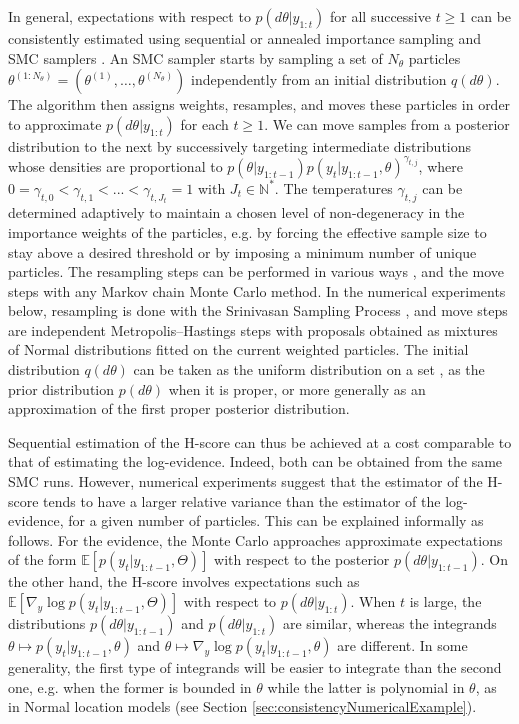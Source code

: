 \documentclass[12pt]{article}
\theoremstyle{plain}
\theoremstyle{definition}
\begin{document}
	In general, expectations with respect to $p(d\theta|y_{1:t})$ for all successive $t\geq 1$ can be
	consistently estimated using sequential or annealed importance sampling \citep{neal2001} and SMC samplers \citep{chopin:2002,delmoral:doucet:jasra2006}. An SMC sampler starts by sampling a set of $N_\theta$ particles
	$\theta^{(1:N_\theta)} = (\theta^{(1)},\ldots,\theta^{(N_\theta)})$ independently from an initial distribution
	$q(d\theta)$. The algorithm then assigns weights, resamples, and moves these particles in
	order to approximate $p(d\theta|y_{1:t})$ 
	for each $t\geq 1$. 
	We can move samples from a posterior distribution to the next 
	by successively targeting intermediate distributions whose densities are
	proportional to $p(\theta|y_{1:t-1}) p(y_t|y_{1:t-1},\theta)^{\gamma_{t,j}}$,
	where $0=\gamma_{t,0} < \gamma_{t,1} < ... < \gamma_{t,J_t} = 1$ with
	$J_t\in\mathbb{N}^*$. The temperatures $\gamma_{t,j}$ can be determined
	adaptively to maintain a chosen level of non-degeneracy in the
	importance weights of the particles, e.g.\! by forcing the effective sample size to stay above a
	desired threshold or by imposing a minimum number of unique particles. The resampling steps can be performed in various ways 
	\citep[see][]{douc2005comparison,murray2016parallel,gerber2017negative},
	and the move steps with any Markov chain Monte Carlo method. 
	In the numerical
	experiments below, resampling is done with the Srinivasan Sampling Process \citep[SSP,][]{gerber2017negative},
	and move steps are independent Metropolis--Hastings steps with proposals obtained as 
	mixtures of Normal distributions fitted on the current weighted particles.
	The initial distribution $q(d\theta)$ can be taken as the uniform distribution on a set \citep[e.g.][]{fearnhead2013adaptive}, 
	as the prior distribution $p(d\theta)$ when it is proper, or more generally as an approximation of the first proper posterior distribution. 
	
	Sequential estimation of the H-score can thus be achieved at
	a cost comparable to that of estimating the log-evidence. Indeed, both can be obtained
	from the same SMC runs.
	However, numerical experiments suggest that the estimator of the H-score tends to have
	a larger relative variance than the estimator of the log-evidence, for a given number of particles. 
	This can be explained informally as follows. For the evidence,
	the Monte Carlo approaches approximate expectations of the form $\mathbb{E}[p(y_t |y_{1:t-1}, \Theta)]$ with respect 
	to the posterior $p(d\theta|y_{1:t-1})$. On the other hand, the H-score involves expectations such as 
	$\mathbb{E}[\nabla_y \log p(y_t |y_{1:t-1}, \Theta)]$ with respect to $p(d\theta|y_{1:t})$. 
	When $t$ is large, the distributions $p(d\theta|y_{1:t-1})$ and $p(d\theta|y_{1:t})$ are similar, whereas the integrands 
	$\theta \mapsto p(y_t |y_{1:t-1}, \theta)$  and $\theta \mapsto \nabla_y \log
	p(y_t |y_{1:t-1}, \theta)$ are different. In some generality, the first type of integrands
	will be easier to integrate than the second one, e.g. when the former is bounded in $\theta$
	while the latter is polynomial in $\theta$, as in Normal location models (see Section
	\ref{sec:consistencyNumericalExample}).
	
\end{document}
